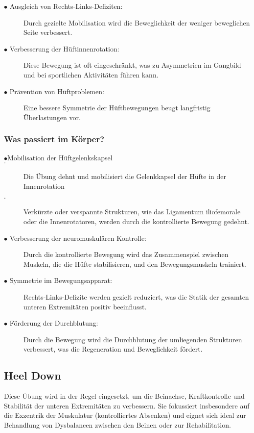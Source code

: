 \begin{description}
        \item[$\bullet$ Ausgleich von Rechts-Links-Defiziten:]  Durch gezielte Mobilisation wird die Beweglichkeit der weniger beweglichen Seite verbessert.
        \item[$\bullet$ Verbesserung der Hüftinnenrotation:]  Diese Bewegung ist oft eingeschränkt, was zu Asymmetrien im Gangbild und bei sportlichen Aktivitäten führen kann.
        \item[$\bullet$ Prävention von Hüftproblemen:]  Eine bessere Symmetrie der Hüftbewegungen beugt langfristig Überlastungen vor.
\end{description}

\subsubsection{Was passiert im Körper?}
\begin{description}
    \item[$\bullet$Mobilisation der Hüftgelenkskapsel]
        \item[$\cdot$]Die Übung dehnt und mobilisiert die Gelenkkapsel der Hüfte in der Innenrotation
        \item[$\cdot$] Verkürzte oder verspannte Strukturen, wie das Ligamentum iliofemorale oder die Innenrotatoren, werden durch die kontrollierte Bewegung gedehnt.
    \item[$\bullet$ Verbesserung der neuromuskulären Kontrolle:] Durch die kontrollierte Bewegung wird das Zusammenspiel zwischen Muskeln, die die Hüfte stabilisieren, und den Bewegungsmuskeln trainiert.
    \item[$\bullet$ Symmetrie im Bewegungsapparat:] Rechts-Links-Defizite werden gezielt reduziert, was die Statik der gesamten unteren Extremitäten positiv beeinflusst.
    \item[$\bullet$ Förderung der Durchblutung:] Durch die Bewegung wird die Durchblutung der umliegenden Strukturen verbessert, was die Regeneration und Beweglichkeit fördert.

\end{description}

\subsection{Heel Down}

Diese Übung wird in der Regel eingesetzt, um die Beinachse, Kraftkontrolle und Stabilität der unteren Extremitäten zu verbessern. Sie fokussiert insbesondere auf die Exzentrik der Muskulatur (kontrolliertes Absenken) und eignet sich ideal zur Behandlung von Dysbalancen zwischen den Beinen oder zur Rehabilitation.

